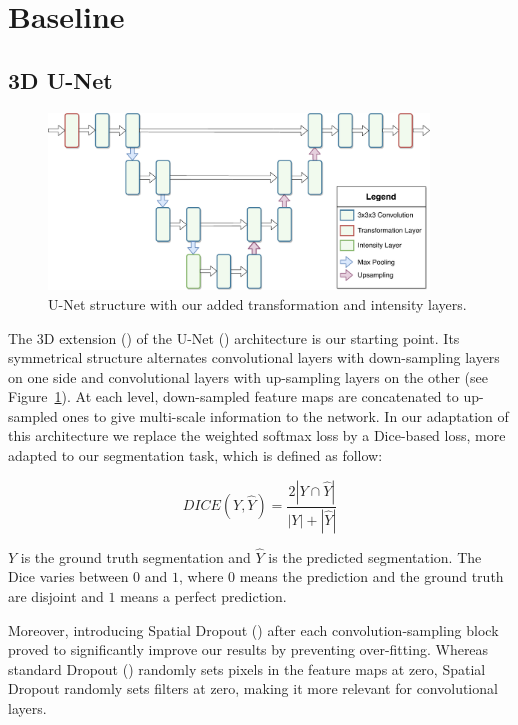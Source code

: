 \section{Baseline}
\label{sec:kidney_baseline}

\subsection{3D U-Net}
\label{ssec:unet}

\begin{figure}[htb]
	\includegraphics[width=0.9\textwidth]{img_transfer/UNet}
    \caption{U-Net structure with our added transformation and intensity layers.}
    \label{fig:unet}
\end{figure}

The 3D extension (\textcite{cicek2016MICCAI}) of the U-Net (\textcite{ronneberger2015MICCAI}) architecture is our starting point. Its symmetrical structure alternates convolutional layers with down-sampling layers on one side and convolutional layers with up-sampling layers on the other (see Figure~\ref{fig:unet}). At each level, down-sampled feature maps are concatenated to up-sampled ones to give multi-scale information to the network. In our adaptation of this architecture we replace the weighted softmax loss by a Dice-based loss, more adapted to our segmentation task, which is defined as follow:

\begin{equation}
    DICE \left( Y, \hat{Y} \right) = \frac{2 |Y \cap \hat{Y}|}{|Y| + |\hat{Y}|}
\end{equation}

$Y$ is the ground truth segmentation and $\hat{Y}$ is the predicted segmentation. The Dice varies between $0$ and $1$, where $0$ means the prediction and the ground truth are disjoint and $1$ means a perfect prediction.

Moreover, introducing Spatial Dropout (\textcite{tompson2015CVPR}) after each convolution-sampling block proved to significantly improve our results by preventing over-fitting. Whereas standard Dropout (\textcite{srivastava2014}) randomly sets pixels in the feature maps at zero, Spatial Dropout randomly sets filters at zero, making it more relevant for convolutional layers.


